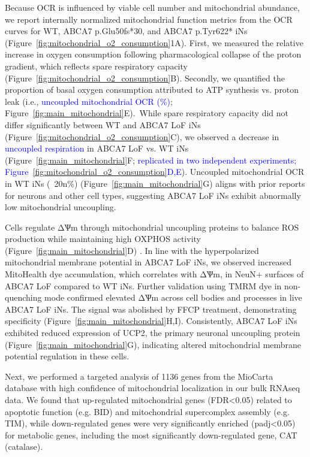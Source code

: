 Because OCR is influenced by viable cell number and mitochondrial abundance\cite{Divakaruni2014-eq,Gu2021-ms}, we report internally normalized mitochondrial function metrics from the OCR curves\cite{Divakaruni2022-rj} for WT, ABCA7 p.Glu50fs*30, and ABCA7 p.Tyr622* iNs (Figure~\ref{fig:mitochondrial_o2_consumption}1A). First, we measured the relative increase in oxygen consumption following pharmacological collapse of the proton gradient, which reflects spare respiratory capacity\cite{Divakaruni2022-rj} (Figure~\ref{fig:mitochondrial_o2_consumption}B). Secondly, we quantified the proportion of basal oxygen consumption attributed to ATP synthesis vs. proton leak (i.e., \textcolor{blue}{uncoupled mitochondrial OCR (\%)}; Figure~\ref{fig:main_mitochondrial}E)\cite{Divakaruni2014-eq}. While spare respiratory capacity did not differ significantly between WT and ABCA7 LoF iNs (Figure~\ref{fig:mitochondrial_o2_consumption}C), we observed a decrease in \textcolor{blue}{uncoupled respiration} in ABCA7 LoF vs. WT iNs (Figure~\ref{fig:main_mitochondrial}F; \textcolor{blue}{replicated in two independent experiments; Figure~\ref{fig:mitochondrial_o2_consumption}D,E}). Uncoupled mitochondrial OCR in WT iNs (~20n\%) (Figure~\ref{fig:main_mitochondrial}G) aligns with prior reports for neurons and other cell types\cite{Divakaruni2011-uj,Jekabsons2004-fn}, suggesting ABCA7 LoF iNs exhibit abnormally low mitochondrial uncoupling.

Cells regulate ΔѰm through mitochondrial uncoupling proteins to balance ROS production while maintaining high OXPHOS activity (Figure~\ref{fig:main_mitochondrial}D) \cite{Demine2019-qj,Zorov2021-dq}. In line with the hyperpolarized mitochondrial membrane potential in ABCA7 LoF iNs, we observed increased MitoHealth dye accumulation, which correlates with ΔѰm, in NeuN+ surfaces of ABCA7 LoF compared to WT iNs. Further validation using TMRM dye in non-quenching mode confirmed elevated ΔѰm across cell bodies and processes in live ABCA7 LoF iNs. The signal was abolished by FFCP treatment, demonstrating specificity (Figure~\ref{fig:main_mitochondrial}H,I). Consistently, ABCA7 LoF iNs exhibited reduced expression of UCP2, the primary neuronal uncoupling protein (Figure~\ref{fig:main_mitochondrial}G), indicating altered mitochondrial membrane potential regulation in these cells. 

Next, we performed a targeted analysis of 1136 genes from the MioCarta database with high confidence of mitochondrial localization in our bulk RNAseq data. We found that up-regulated mitochondrial genes (FDR<0.05) related to apoptotic function (e.g. BID) and mitochondrial supercomplex assembly (e.g. TIM), while down-regulated genes were very significantly enriched (padj<0.05) for metabolic genes, including the most significantly down-regulated gene, CAT (catalase). 

